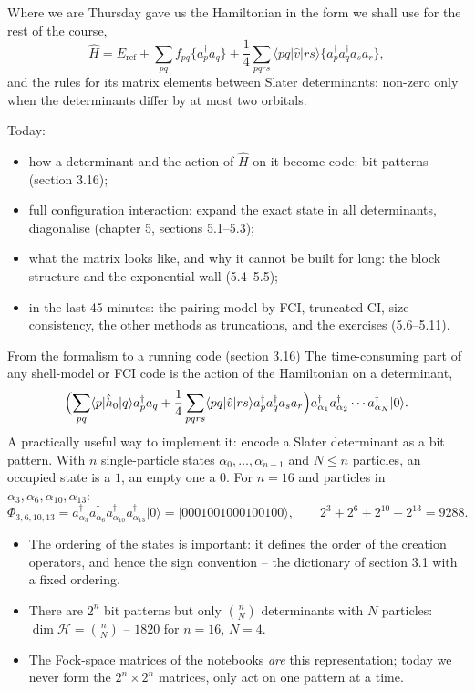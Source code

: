 \documentclass[aspectratio=169,10pt]{beamer}
\newcommand{\ket}[1]{\vert #1\rangle}
\newcommand{\element}[3]{\langle #1\vert #2\vert #3\rangle}
\newcommand{\nc}[1]{\bigl\{#1\bigr\}}
\begin{document}
\begin{frame}{Where we are}
  Thursday gave us the Hamiltonian in the form we shall use for the rest of the course,
  \[
    \hat{H}=E_{\mathrm{ref}}+\sum_{pq}f_{pq}\nc{a_p^{\dagger}a_q}+\frac14\sum_{pqrs}\element{pq}{\hat{v}}{rs}\nc{a_p^{\dagger}a_q^{\dagger}a_sa_r},
  \]
  and the rules for its matrix elements between Slater determinants: non-zero only when the determinants differ by at most two orbitals.
  \vspace{0.3em}

  Today:
  \begin{itemize}
    \item how a determinant and the action of $\hat{H}$ on it become \alert{code}: bit patterns (section 3.16);
    \item \alert{full configuration interaction}: expand the exact state in all determinants, diagonalise (chapter 5, sections 5.1--5.3);
    \item what the matrix looks like, and why it cannot be built for long: the block structure and the \alert{exponential wall} (5.4--5.5);
    \item in the last 45 minutes: the pairing model by FCI, truncated CI, size consistency, the other methods as truncations, and the exercises (5.6--5.11).
  \end{itemize}
\end{frame}

\begin{frame}{From the formalism to a running code (section 3.16)}
  \vspace{-0.2em}The time-consuming part of any shell-model or FCI code is the action of the Hamiltonian on a determinant,
  \[
    \Bigl(\sum_{pq}\element{p}{\hat{h}_0}{q}a_p^{\dagger}a_q
    +\frac14\sum_{pqrs}\element{pq}{\hat{v}}{rs}a_p^{\dagger}a_q^{\dagger}a_sa_r\Bigr)
    a_{\alpha_1}^{\dagger}a_{\alpha_2}^{\dagger}\cdots a_{\alpha_N}^{\dagger}\ket{0}.
  \]
  A practically useful way to implement it: \alert{encode a Slater determinant as a bit pattern}. With $n$ single-particle states $\alpha_0,\dots,\alpha_{n-1}$ and $N\le n$ particles, an occupied state is a $1$, an empty one a $0$. For $n=16$ and particles in $\alpha_3,\alpha_6,\alpha_{10},\alpha_{13}$:
  \[
    \Phi_{3,6,10,13}=a_{\alpha_3}^{\dagger}a_{\alpha_6}^{\dagger}a_{\alpha_{10}}^{\dagger}a_{\alpha_{13}}^{\dagger}\ket{0}
    =\ket{0001001000100100},
    \qquad 2^3+2^6+2^{10}+2^{13}=9288 .
  \]
  \begin{itemize}
    \item The ordering of the states is important: it defines the order of the creation operators, and hence the sign convention -- the dictionary of section 3.1 with a fixed ordering.
    \item There are $2^n$ bit patterns but only $\binom{n}{N}$ determinants with $N$ particles: $\dim\mathcal{H}=\binom{n}{N}$ -- $1820$ for $n=16$, $N=4$.
    \item The Fock-space matrices of the notebooks \emph{are} this representation; today we never form the $2^n\times2^n$ matrices, only act on one pattern at a time.
  \end{itemize}
\end{frame}
\end{document}
